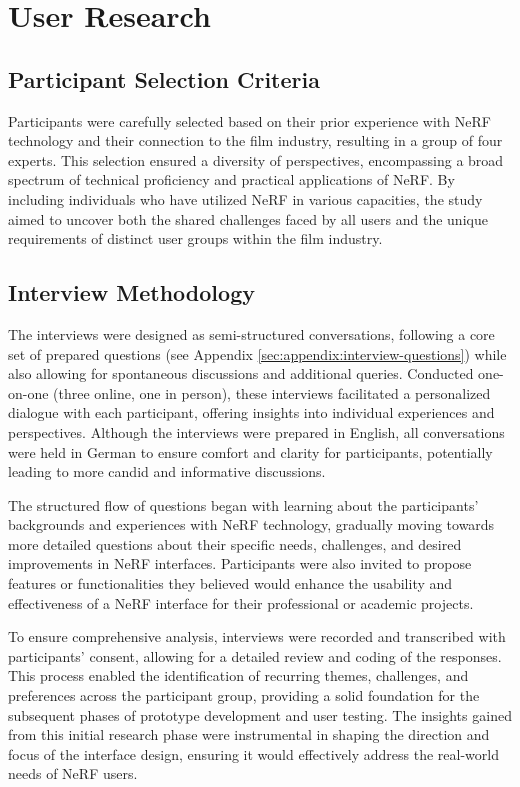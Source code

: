 %
\chapter{User Research}
\label{sec:user-research}

\section{Participant Selection Criteria}
\label{sec:user-research:criteria}

Participants were carefully selected based on their prior experience with NeRF technology and their connection to the film industry, resulting in a group of four experts. 
This selection ensured a diversity of perspectives, encompassing a broad spectrum of technical proficiency and practical applications of NeRF. 
By including individuals who have utilized NeRF in various capacities, the study aimed to uncover both the shared challenges faced by all users and the unique requirements of distinct user groups within the film industry.

\section{Interview Methodology}
\label{sec:user-research:interview}

The interviews were designed as semi-structured conversations, following a core set of prepared questions (see Appendix \ref{sec:appendix:interview-questions}) while also allowing for spontaneous discussions and additional queries. 
Conducted one-on-one (three online, one in person), these interviews facilitated a personalized dialogue with each participant, offering insights into individual experiences and perspectives. 
Although the interviews were prepared in English, all conversations were held in German to ensure comfort and clarity for participants, potentially leading to more candid and informative discussions.

The structured flow of questions began with learning about the participants' backgrounds and experiences with NeRF technology, gradually moving towards more detailed questions about their specific needs, challenges, and desired improvements in NeRF interfaces. 
Participants were also invited to propose features or functionalities they believed would enhance the usability and effectiveness of a NeRF interface for their professional or academic projects.

To ensure comprehensive analysis, interviews were recorded and transcribed with participants' consent, allowing for a detailed review and coding of the responses. 
This process enabled the identification of recurring themes, challenges, and preferences across the participant group, providing a solid foundation for the subsequent phases of prototype development and user testing. 
The insights gained from this initial research phase were instrumental in shaping the direction and focus of the interface design, ensuring it would effectively address the real-world needs of NeRF users.

